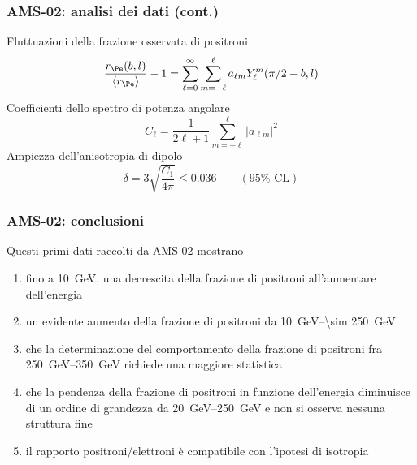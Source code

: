 \documentclass[10pt]{beamer}
\begin{document}
\begin{frame}
  \frametitle{AMS-02: analisi dei dati (cont.)}
  Fluttuazioni della frazione osservata di positroni
  \begin{equation*}
    \frac{r_{\Pe}(b,l)}{\langle r_{\Pe}\rangle} - 1 = \sum_{\ell=0}^{\infty}
    \sum_{m=-\ell}^{\ell} a_{\ell m}Y_{\ell}^{m}(\pi/2 - b,l)
  \end{equation*}
  Coefficienti dello spettro di potenza angolare
  \begin{equation*}
    C_{\ell} = \frac{1}{2\ell + 1} \sum_{m=-\ell}^{\ell} \lvert a_{\ell m}
    \rvert^{2}
  \end{equation*}
  Ampiezza dell'anisotropia di dipolo
  \begin{equation*}
    \delta = 3 \sqrt{\frac{C_{1}}{4\pi}} \leq 0.036 \qquad (95\% \text{ CL})
  \end{equation*}
\end{frame}

\begin{frame}
  \frametitle{AMS-02: conclusioni}
  Questi primi dati raccolti da AMS-02 mostrano
  \begin{enumerate}[<+->]
  \item fino a \SI{10}{\giga \electronvolt}, una
    \alert{decrescita della frazione di positroni} all'aumentare dell'energia
  \item un evidente \alert{aumento della frazione di positroni} da
    \SIrange[range-phrase={ fino a }]{10}{\sim 250}{\giga \electronvolt}
  \item che la determinazione del comportamento della frazione di positroni fra
    \SIrange[range-phrase={ e }]{250}{350}{\giga \electronvolt} richiede una
    \alert{maggiore statistica}
  \item che la
    \alert{pendenza della frazione di positroni in funzione dell'energia
      diminuisce}
    di un ordine di grandezza da
    \SIrange[range-phrase={ a }]{20}{250}{\giga \electronvolt} e non si osserva
    \alert{nessuna struttura fine}
  \item il rapporto positroni/elettroni è compatibile con l'ipotesi di isotropia
  \end{enumerate}
\end{frame}
\end{document}
